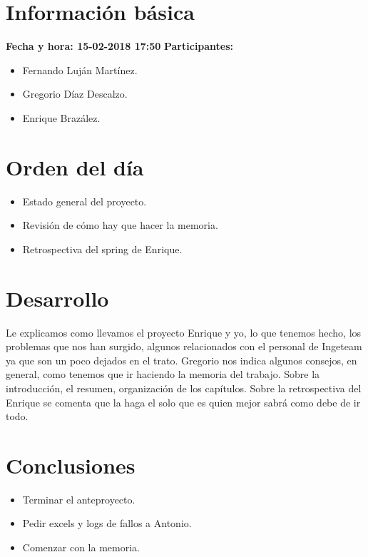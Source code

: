 \documentclass[a4paper]{article}
\begin{document}
\section{Información básica}
\textbf{Fecha y hora: 15-02-2018 17:50}
\newline
\textbf{Participantes:}
\begin{itemize}
	\item Fernando Luján Martínez.
    \item Gregorio Díaz Descalzo.
    \item Enrique Brazález.
\end{itemize}
\section{Orden del día}
\begin{itemize}
\item Estado general del proyecto.
\item Revisión de cómo hay que hacer la memoria.
\item Retrospectiva del spring de Enrique.

\end{itemize}
\section{Desarrollo}
Le explicamos como llevamos el proyecto Enrique y yo, lo que tenemos hecho, los problemas que nos han surgido, algunos relacionados con el personal de Ingeteam ya que son un poco dejados en el trato.
Gregorio nos indica algunos consejos, en general, como tenemos que ir haciendo la memoria del trabajo. Sobre la introducción, el resumen, organización de los capítulos.
Sobre la retrospectiva del Enrique se comenta que la haga el solo que es quien mejor sabrá como debe de ir todo.

\section{Conclusiones}
\begin{itemize}
\item Terminar el anteproyecto.
\item Pedir excels y logs de fallos a Antonio.
\item Comenzar con la memoria.
\end{itemize}
\end{document}
